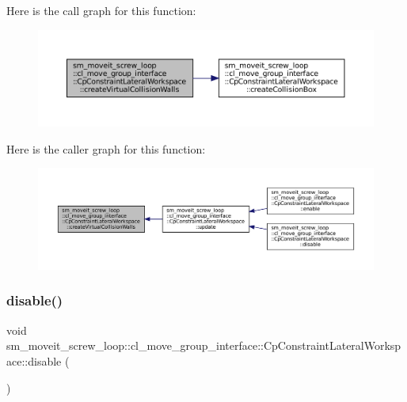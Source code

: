 Here is the call graph for this function\+:
\nopagebreak
\begin{figure}[H]
\begin{center}
\leavevmode
\includegraphics[width=350pt]{classsm__moveit__screw__loop_1_1cl__move__group__interface_1_1CpConstraintLateralWorkspace_a0eab8923125db7d219b12ca0716f3fe4_cgraph}
\end{center}
\end{figure}
Here is the caller graph for this function\+:
\nopagebreak
\begin{figure}[H]
\begin{center}
\leavevmode
\includegraphics[width=350pt]{classsm__moveit__screw__loop_1_1cl__move__group__interface_1_1CpConstraintLateralWorkspace_a0eab8923125db7d219b12ca0716f3fe4_icgraph}
\end{center}
\end{figure}
\mbox{\label{classsm__moveit__screw__loop_1_1cl__move__group__interface_1_1CpConstraintLateralWorkspace_a65f69ec94f60890ee6c5130a3f010fe6}} 
\subsubsection{\texorpdfstring{disable()}{disable()}}
{\footnotesize\ttfamily void sm\+\_\+moveit\+\_\+screw\+\_\+loop\+::cl\+\_\+move\+\_\+group\+\_\+interface\+::\+Cp\+Constraint\+Lateral\+Workspace\+::disable (\begin{DoxyParamCaption}{ }\end{DoxyParamCaption})}



